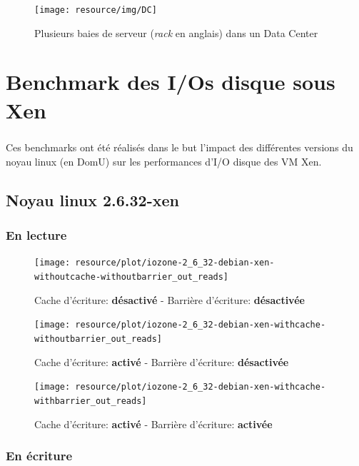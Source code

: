 \begin{figure}[H]
	\centering
	\texttt{[image: resource/img/DC]}
	\caption{Plusieurs baies de serveur (\emph{rack} en anglais) dans un Data Center}
	\label{datacenter}
\end{figure}


\chapter{Benchmark des I/Os disque sous Xen}

\paragraph*{}
Ces benchmarks ont été réalisés dans le but l'impact des différentes versions du noyau linux
(en DomU) sur les performances d'I/O disque des VM Xen.


\section{Noyau linux 2.6.32-xen}

\subsection*{En lecture}

\begin{figure}[H]
	\centering
	\texttt{[image: resource/plot/iozone-2\_6\_32-debian-xen-withoutcache-withoutbarrier\_out\_reads]}
	\caption{Cache d'écriture: \textbf{désactivé}   -   Barrière d'écriture: \textbf{désactivée}}
\end{figure}

\begin{figure}[H]
	\centering
	\texttt{[image: resource/plot/iozone-2\_6\_32-debian-xen-withcache-withoutbarrier\_out\_reads]}
	\caption{Cache d'écriture: \textbf{activé}   -   Barrière d'écriture: \textbf{désactivée}}
\end{figure}

\begin{figure}[H]
	\centering
	\texttt{[image: resource/plot/iozone-2\_6\_32-debian-xen-withcache-withbarrier\_out\_reads]}
	\caption{Cache d'écriture: \textbf{activé}   -   Barrière d'écriture: \textbf{activée}}
\end{figure}

\subsection*{En écriture}

